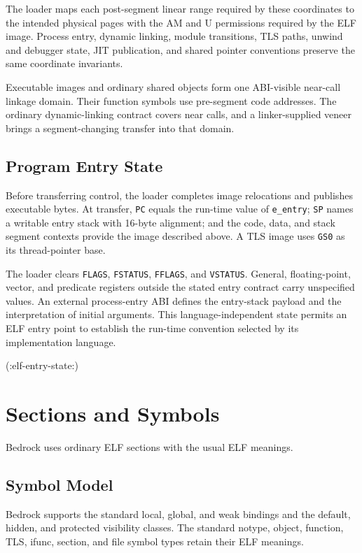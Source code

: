 \documentclass[10pt,twoside]{article}
\begin{document}
The loader maps each post-segment linear range required by these coordinates
to the intended physical pages with the AM and U permissions required by the
ELF image. Process entry, dynamic linking, module transitions, TLS paths,
unwind and debugger state, JIT publication, and shared pointer conventions
preserve the same coordinate invariants.

Executable images and ordinary shared objects form one ABI-visible near-call
linkage domain. Their function symbols use pre-segment code addresses. The
ordinary dynamic-linking contract covers near calls, and a linker-supplied
veneer brings a segment-changing transfer into that domain.

\subsection{Program Entry State}
Before transferring control, the loader completes image relocations and
publishes executable bytes. At transfer, \texttt{PC} equals the run-time value
of \texttt{e\_entry}; \texttt{SP} names a writable entry stack with 16-byte
alignment; and the code, data, and stack segment contexts provide the image
described above. A TLS image uses \texttt{GS0} as its thread-pointer base.

The loader clears \texttt{FLAGS}, \texttt{FSTATUS}, \texttt{FFLAGS}, and
\texttt{VSTATUS}.
General, floating-point, vector, and predicate registers outside the stated
entry contract carry unspecified values. An external process-entry ABI defines
the entry-stack payload and the interpretation of initial arguments. This
language-independent state permits an ELF entry point to establish the
run-time convention selected by its implementation language.

(:elf-entry-state:)

\clearpage
\section{Sections and Symbols}\label{page:sections-and-symbols}
Bedrock uses ordinary ELF sections with the usual ELF meanings.
\subsection{Symbol Model}
Bedrock supports the standard local, global, and weak bindings and the
default, hidden, and protected visibility classes. The standard notype,
object, function, TLS, ifunc, section, and file symbol types retain their ELF
meanings.
\end{document}
